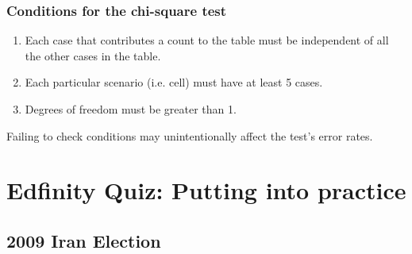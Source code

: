 \documentclass[slidestop,compress,mathserif]{beamer}
\begin{document}
\begin{frame}
\frametitle{Conditions for the chi-square test}

\begin{enumerate}

\item {} Each case that contributes a count to the table must be independent of all the other cases in the table.

\pause

\item {} Each particular scenario (i.e. cell) must have at least 5  cases.

\pause

\item {} Degrees of freedom must be greater than 1.

\end{enumerate}

\pause

Failing to check conditions may unintentionally affect the test's error rates.

\end{frame}


\section{Edfinity Quiz: Putting into practice}


\subsection{2009 Iran Election}

\end{document}
